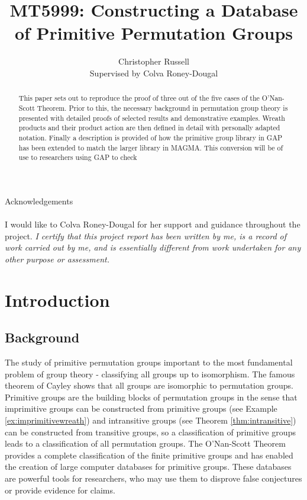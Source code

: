 \documentclass[]{article}
\title{MT5999: Constructing a Database of Primitive Permutation Groups}
\author{Christopher Russell \vspace{0.1cm}\\ Supervised by Colva Roney-Dougal}
\theoremstyle{definition}
\begin{document}
\maketitle
\clearpage
\noindent
{\LARGE Acknowledgements}
\\
\\I would like to Colva Roney-Dougal for her support and guidance throughout the project.
\clearpage
\noindent \emph{I certify that this project report has been written by me, is a record of work carried out
by me, and is essentially different from work undertaken for any other purpose or assessment.}
\clearpage
\begin{abstract}
This paper sets out to reproduce the proof of three out of the five cases of the O'Nan-Scott Theorem. Prior to this, the necessary background in permutation group theory is presented with detailed proofs of selected results and demonstrative examples. Wreath products and their product action are then defined in detail with personally adapted notation. Finally a description is provided of how the primitive group library in GAP has been extended to match the larger library in MAGMA. This conversion will be of use to researchers using GAP to check 
\end{abstract}
\clearpage
\tableofcontents
\clearpage
\section{Introduction}
\subsection{Background}
The study of primitive permutation groups important to the most fundamental problem of group theory - classifying all groups up to isomorphism. The famous theorem of Cayley shows that all groups are isomorphic to permutation groups. Primitive groups are the building blocks of permutation groups in the sense that imprimitive groups can be constructed from primitive groups (see Example \ref{ex:imprimitivewreath}) and intransitive groups (see Theorem \ref{thm:intransitive}) can be constructed from transitive groups, so a classification of primitive groups leads to a classification of all permutation groups. The O'Nan-Scott Theorem provides a complete classification of the finite primitive groups and has enabled the creation of large computer databases for primitive groups. These databases are powerful tools for researchers, who may use them to disprove false conjectures or provide evidence for claims.
\end{document}
